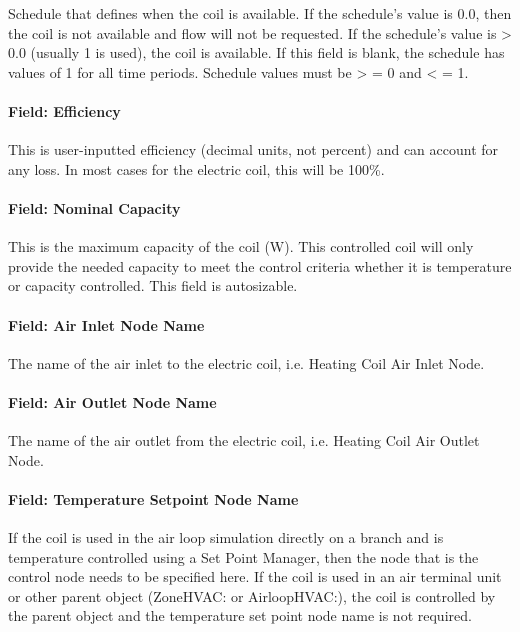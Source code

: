 Schedule that defines when the coil is available. If the schedule's value is 0.0, then the coil is not available and flow will not be requested. If the schedule's value is \textgreater{} 0.0 (usually 1 is used), the coil is available. If this field is blank, the schedule has values of 1 for all time periods. Schedule values must be \textgreater{} = 0 and \textless{} = 1.

\paragraph{Field: Efficiency}\label{field-efficiency}

This is user-inputted efficiency (decimal units, not percent) and can account for any loss. In most cases for the electric coil, this will be 100\%.

\paragraph{Field: Nominal Capacity}\label{field-nominal-capacity-000}

This is the maximum capacity of the coil (W). This controlled coil will only provide the needed capacity to meet the control criteria whether it is temperature or capacity controlled. This field is autosizable.

\paragraph{Field: Air Inlet Node Name}\label{field-air-inlet-node-name-3-001}

The name of the air inlet to the electric coil, i.e. Heating Coil Air Inlet Node.

\paragraph{Field: Air Outlet Node Name}\label{field-air-outlet-node-name-3-001}

The name of the air outlet from the electric coil, i.e. Heating Coil Air Outlet Node.

\paragraph{Field: Temperature Setpoint Node Name}\label{field-temperature-setpoint-node-name-1}

If the coil is used in the air loop simulation directly on a branch and is temperature controlled using a Set Point Manager, then the node that is the control node needs to be specified here. If the coil is used in an air terminal unit or other parent object (ZoneHVAC: or AirloopHVAC:), the coil is controlled by the parent object and the temperature set point node name is not required.

